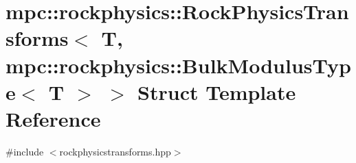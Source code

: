 \hypertarget{structmpc_1_1rockphysics_1_1_rock_physics_transforms_3_01_t_00_01mpc_1_1rockphysics_1_1_bulk_modulus_type_3_01_t_01_4_01_4}{}\section{mpc\+:\+:rockphysics\+:\+:Rock\+Physics\+Transforms$<$ T, mpc\+:\+:rockphysics\+:\+:Bulk\+Modulus\+Type$<$ T $>$ $>$ Struct Template Reference}
\label{structmpc_1_1rockphysics_1_1_rock_physics_transforms_3_01_t_00_01mpc_1_1rockphysics_1_1_bulk_modulus_type_3_01_t_01_4_01_4}


{\ttfamily \#include $<$rockphysicstransforms.\+hpp$>$}

